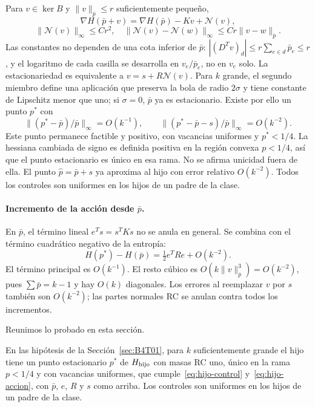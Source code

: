 Para $v\in\ker B$ y $\|v\|_{\bar p}\le r$ suficientemente pequeño,
\[
 \nabla H(\bar p+v)=\nabla H(\bar p)-Kv+\mathcal N(v),
\]
\[
 \|\mathcal N(v)\|_\infty\le Cr^2,\quad
 \|\mathcal N(v)-\mathcal N(w)\|_\infty\le Cr\|v-w\|_{\bar p}.
\]
Las constantes no dependen de una cota inferior de $\bar p$:
$|(D^Tv)_d|\le r\sum_{e\in d}\bar p_e\le r$, y el logaritmo de cada
casilla se desarrolla en $v_e/\bar p_e$, no en $v_e$ solo.
La estacionariedad es equivalente a $v=s+R\mathcal N(v)$.
Para $k$ grande, el segundo miembro define una aplicación que preserva la bola de radio $2\sigma$
y tiene constante de Lipschitz menor que uno; si $\sigma=0$, $\bar p$ ya es estacionario.
Existe por ello un punto $p^*$ con
\begin{equation}\label{eq:hijo-control}
 \boxed{\|(p^*-\bar p)/\bar p\|_\infty=O(k^{-1}),\qquad
 \|(p^*-\bar p-s)/\bar p\|_\infty=O(k^{-2}).}
\end{equation}
Este punto permanece factible y positivo, con vacancias uniformes y $p^*<1/4$.
La hessiana cambiada de signo es definida positiva en la región convexa $p<1/4$,
así que el punto estacionario es único en esa rama. No se afirma unicidad fuera de ella.
El punto $\widehat p=\bar p+s$ ya aproxima al hijo con error relativo $O(k^{-2})$.
Todos los controles son uniformes en los hijos de un padre de la clase.

\paragraph{Incremento de la acción desde $\bar p$.}
En $\bar p$, el término lineal $e^Ts=s^TKs$ no se anula en general. Se combina con
el término cuadrático negativo de la entropía:
\begin{equation}\label{eq:hijo-accion}
 \boxed{H(p^*)-H(\bar p)=\tfrac12 e^TRe+O(k^{-2}).}
\end{equation}
El término principal es $O(k^{-1})$. El resto cúbico es
$O(k\|v\|_{\bar p}^3)=O(k^{-2})$, pues $\sum\bar p=k-1$
y hay $O(k)$ diagonales. Los errores al reemplazar $v$ por $s$ también son
$O(k^{-2})$; las partes normales RC se anulan contra todos los incrementos.

Reunimos lo probado en esta sección.
\begin{lemasub}\label{lem:hijo}
En las hipótesis de la Sección~\ref{sec:B4T01}, para $k$ suficientemente grande el hijo tiene un
punto estacionario $p^*$ de $H_{\rm hijo}$ con masas RC uno, único en la rama $p<1/4$ y con
vacancias uniformes, que cumple~\eqref{eq:hijo-control} y~\eqref{eq:hijo-accion}, con $\bar p$,
$e$, $R$ y $s$ como arriba. Los controles son uniformes en los hijos de un padre de la clase.
\end{lemasub}
